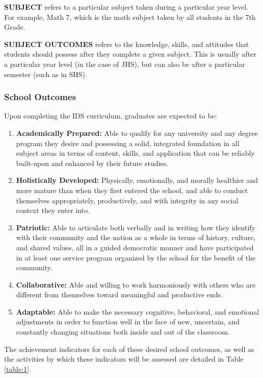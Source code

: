 \textbf{SUBJECT} refers to a particular subject taken during a particular year level. For example, Math 7, which is the math subject taken by all students in the 7th Grade.

\textbf{SUBJECT OUTCOMES} refers to the knowledge, skills, and attitudes that students should possess after they complete a given subject. This is usually after a particular year level (in the case of JHS), but can also be after a particular semester (such as in SHS).

\subsubsection{School Outcomes}
Upon completing the IDS curriculum, graduates are expected to be:
\begin{enumerate}[label=\Alph*. ]
	\item{\textbf{Academically Prepared:} Able to qualify for any university and any degree program they desire and possessing a solid, integrated foundation in all subject areas in terms of content, skills, and application that can be reliably built-upon and enhanced by their future studies.}
	\item{\textbf{Holistically Developed:} Physically, emotionally, and morally healthier and more mature than when they first entered the school, and able to conduct themselves appropriately, productively, and with integrity in any social context they enter into.}
	\item{\textbf{Patriotic:} Able to articulate both verbally and in writing how they identify with their community and the nation as a whole in terms of history, culture, and shared values, all in a guided democratic manner and have participated in at least one service program organized by the school for the benefit of the community.}
	\item{\textbf{Collaborative:} Able and willing to work harmoniously with others who are different from themselves toward meaningful and productive ends.}
	\item{\textbf{Adaptable:} Able to make the necessary cognitive, behavioral, and emotional adjustments in order to function well in the face of new, uncertain, and constantly changing situations both inside and out of the classroom.}
\end{enumerate}

The achievement indicators for each of these desired school outcomes, as well as the activities by which these indicators will be assessed are detailed in Table \ref{table:1}.

